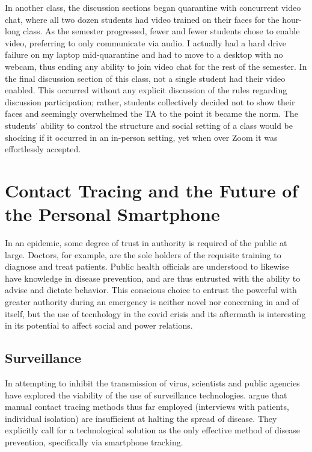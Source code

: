 \documentclass[2020/08/28 v2]{../../../coursework}
\begin{document}
In another class, the discussion sections began quarantine with concurrent video
chat, where all two dozen students had video trained on their faces for the
hour-long class. As the semester progressed, fewer and fewer students chose to
enable video, preferring to only communicate via audio. I actually had a hard
drive failure on my laptop mid-quarantine
and had to move to a desktop with no webcam, thus ending any ability to join
video chat for the rest of the semester.
In the final discussion section of this class, not a single student had their
video enabled. This occurred without any explicit discussion of the rules regarding
discussion participation; rather, students collectively decided not to show their
faces and seemingly overwhelmed the TA to the point it became the norm.
The students' ability to control the structure and social setting of a class would
be shocking if it occurred in an in-person setting, yet when over Zoom it was 
effortlessly accepted.

\section{Contact Tracing and the Future of the Personal Smartphone}

In an epidemic, some degree of trust in authority is required of the
public at large. Doctors, for example, are the sole holders of the
requisite training to diagnose and treat patients. Public health officials
are understood to likewise have knowledge in disease prevention, and are
thus entrusted with the ability to advise and dictate behavior. This
conscious choice to entrust the powerful with greater authority during an
emergency is neither novel nor concerning in and of itself, but the use of tecnhology in
the \ac{covid} crisis and its aftermath is interesting in its potential to
affect social and power relations.

\subsection{Surveillance}

In attempting to inhibit the transmission of \ac{virus}, scientists and public
agencies have explored the viability of the use of surveillance technologies.
\textcite{Ferretti2020} argue that manual contact tracing methods thus far employed
(interviews with patients, individual isolation) are insufficient at halting the
spread of disease. They explicitly call for a technological solution as the only
effective method of disease prevention, specifically via smartphone tracking.
\end{document}

